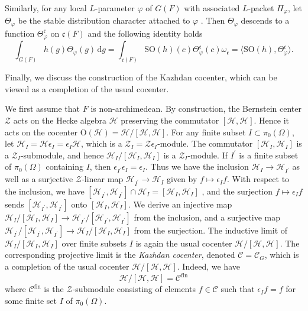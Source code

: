 \documentclass[iccmp]{ipbook}
\newcommand{\CC}{{\mathcal {C}}}
\newcommand{\CH}{{\mathcal {H}}}
\newcommand{\CZ}{{\mathcal {Z}}}
\newcommand{\Fc}{{\mathfrak {c}}}
\newcommand{\RO}{{\mathrm {O}}}
\newcommand{\RS}{{\mathrm {S}}}
\newcommand{\ud}{\,\mathrm{d}}
\def\eps{{\epsilon}}
\def\ome{{\omega}}
\def\Ome{{\Omega}}
\newcommand{\fin}{\mathrm{fin}}
\def\vphi{\varphi}
\def\p{\prime}
\begin{document}
Similarly, for any local $L$-parameter $\vphi$ of $G(F)$ with associated $L$-packet $\Pi_\vphi$, let $\Theta_{\vphi}$ be the stable distribution character attached to $\vphi$ \cite{MR0540901}. Then $\Theta_\vphi$ descends to a function $\Theta^\Fc_\vphi$ on $\Fc(F)$ and the following identity holds
\begin{equation}\label{eq:CC-OI:2}
\int_{G(F)}
h(g)\Theta_\vphi(g)\ud g = 
\int_{\Fc(F)}
\RS\RO(h)(c)
\Theta^\Fc_{\vphi}(c)\ome_\Fc = 
\langle \RS\RO(h),\Theta^\Fc_{\vphi}\rangle.
\end{equation}

Finally, we discuss the construction of the Kazhdan cocenter, which can be viewed as a completion of the usual cocenter.

We first assume that $F$ is non-archimedean. By construction, the Bernstein center $\CZ$ acts on the Hecke algebra $\CH$ preserving the commutator $[\CH,\CH]$. Hence it acts on the cocenter $\RO(\CH) = \CH/[\CH,\CH]$. For any finite subset $I\subset \pi_0(\Ome)$, let $\CH_I = \CH \eps_I = \eps_I\CH$, which is a $\CZ_I =\CZ\eps_I$-module. The commutator $[\CH_I,\CH_I]$ is a $\CZ_I$-submodule, and hence $\CH_I/[\CH_I,\CH_I]$ is a $\CZ_I$-module. If $I^\p$ is a finite subset of $\pi_0(\Ome)$ containing $I$, then $\eps_{I^\p}\eps_I = \eps_I$. Thus we have the inclusion $\CH_I\to \CH_{I^\p}$ as well as a surjective $\CZ$-linear map $\CH_{I^\p}\to \CH_I$ given by $f\mapsto \eps_I f$. With respect to the inclusion, we have $[\CH_{I^\p},\CH_{I^\p}]\cap \CH_I = [\CH_I,\CH_I]$ \cite[Lem.~3.2]{KazCus}, and the surjection $f\mapsto \eps_I f$ sends $[\CH_{I^\p},\CH_{I^\p}]$ onto $[\CH_I,\CH_I]$. We derive an injective map $\CH_I/[\CH_I,\CH_I]\to \CH_{I^\p}/[\CH_{I^\p},\CH_{I^\p}]$ from the inclusion, and a surjective map $\CH_{I^\p}/[\CH_{I^\p},\CH_{I^\p}]\to \CH_I/[\CH_I,\CH_I]$ from the surjection. The inductive limit of $\CH_I/[\CH_I,\CH_I]$ over finite subsets $I$ is again the usual cocenter $\CH/[\CH,\CH]$. The corresponding projective limit is the \emph{Kazhdan cocenter}, denoted $\CC=\CC_G$, which is a completion of the usual cocenter $\CH/[\CH,\CH]$. Indeed, we have
$$
\CH/[\CH,\CH] = \CC^\fin
$$
where $\CC^\fin$ is the $\CZ$-submodule consisting of elements $f\in \CC$ such that $\eps_I f = f$ for some finite set $I$ of $\pi_0(\Ome)$.
\end{document}
